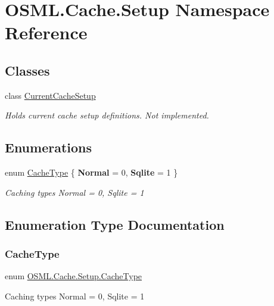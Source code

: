 \hypertarget{namespaceOSML_1_1Cache_1_1Setup}{}\section{O\+S\+M\+L.\+Cache.\+Setup Namespace Reference}
\label{namespaceOSML_1_1Cache_1_1Setup}
\subsection*{Classes}
\begin{DoxyCompactItemize}
\item 
class \mbox{\hyperlink{classOSML_1_1Cache_1_1Setup_1_1CurrentCacheSetup}{Current\+Cache\+Setup}}
\begin{DoxyCompactList}\small\item\em Holds current cache setup definitions. Not implemented. \end{DoxyCompactList}\end{DoxyCompactItemize}
\subsection*{Enumerations}
\begin{DoxyCompactItemize}
\item 
enum \mbox{\hyperlink{namespaceOSML_1_1Cache_1_1Setup_abdb98825a257abbcae6c186d8ba7a088}{Cache\+Type}} \{ {\bfseries Normal} = 0, 
{\bfseries Sqlite} = 1
 \}
\begin{DoxyCompactList}\small\item\em Caching types Normal = 0, Sqlite = 1 \end{DoxyCompactList}\end{DoxyCompactItemize}


\subsection{Enumeration Type Documentation}
\mbox{\label{namespaceOSML_1_1Cache_1_1Setup_abdb98825a257abbcae6c186d8ba7a088}} 
\subsubsection{\texorpdfstring{CacheType}{CacheType}}
{\footnotesize\ttfamily enum \mbox{\hyperlink{namespaceOSML_1_1Cache_1_1Setup_abdb98825a257abbcae6c186d8ba7a088}{O\+S\+M\+L.\+Cache.\+Setup.\+Cache\+Type}}\hspace{0.3cm}{\ttfamily [strong]}}



Caching types Normal = 0, Sqlite = 1 

